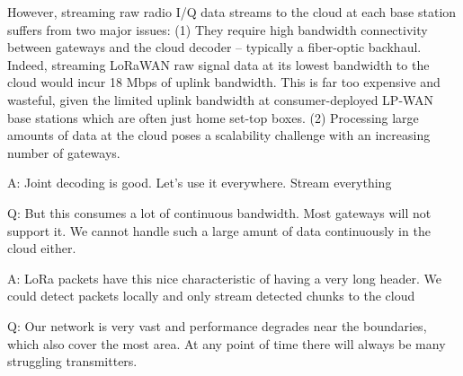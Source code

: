 However, streaming raw radio I/Q data streams to the cloud at each base station suffers from two major issues: (1) They require high bandwidth connectivity between gateways and the cloud decoder -- typically a fiber-optic backhaul. Indeed, streaming LoRaWAN raw signal data at its lowest bandwidth  to the cloud would incur 18 Mbps of uplink bandwidth. This is far too expensive and wasteful, given the limited uplink bandwidth at consumer-deployed LP-WAN base stations which are often just home set-top boxes. (2) Processing large amounts of data at the cloud poses a scalability challenge with an increasing number of gateways.








A: Joint decoding is good. Let's use it everywhere. Stream everything

Q: But this consumes a lot of continuous bandwidth. Most gateways will not support it. We cannot handle such a large amunt of data continuously in the cloud either.

A: LoRa packets have this nice characteristic of having a very long header. We could detect packets locally and only stream detected chunks to the cloud

Q: Our network is very vast and performance degrades near the boundaries, which also cover the most area. At any point of time there will always be many struggling transmitters.
